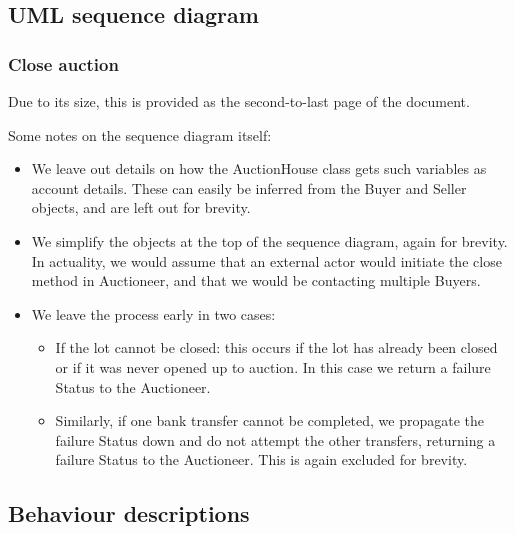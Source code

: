 \documentclass[titlepage, 12pt]{extarticle}
\begin{document}
\subsection{UML sequence diagram}
\subsubsection{Close auction}
Due to its size, this is provided as the second-to-last page of the document.

\noindent Some notes on the sequence diagram itself:
\begin{itemize}
  \item We leave out details on how the AuctionHouse class gets such variables as account details. These can easily be inferred from the Buyer and Seller objects, and are left out for brevity. 
  \item We simplify the objects at the top of the sequence diagram, again for brevity. In actuality, we would assume that an external actor would initiate the close method in Auctioneer, and that we would be contacting multiple Buyers.
  \item We leave the process early in two cases:
    \begin{itemize}
      \item If the lot cannot be closed: this occurs if the lot has already been closed or if it was never opened up to auction. In this case we return a failure Status to the Auctioneer.
      \item Similarly, if one bank transfer cannot be completed, we propagate the failure Status down and do not attempt the other transfers, returning a failure Status to the Auctioneer. This is again excluded for brevity.
    \end{itemize}
\end{itemize}

\subsection{Behaviour descriptions}
\end{document}
